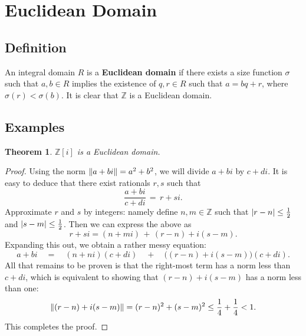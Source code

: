 \documentclass[11pt]{article}
\newtheorem{theorem}{Theorem}
\begin{document}
\section{Euclidean Domain}


\subsection{Definition}

An integral domain $R$ is a  \textbf{Euclidean domain} if there exists a size function $\sigma$ such that $a, b \in R$ implies the existence of $q, r \in R$ such that $a = bq + r$, where $\sigma(r) < \sigma(b)$. It is clear that $\mathbb{Z}$ is a Euclidean domain.


\subsection{Examples}

\begin{adjustwidth}{0.5cm}{}
  \begin{theorem}
    $\mathbb{Z}[i]$ is a Euclidean domain.
  \end{theorem}
  \begin{proof}
    Using the norm $\norm{a + bi} = a^{2} + b^{2}$, we will divide $a + bi$ by $c + di$. It is easy to deduce that there exist rationals $r, s$ such that
    \[
      \frac{a + bi}{c + di} \, = \, r + si.
    \]
    Approximate $r$ and $s$ by integers: namely define $n, m 
    \in \mathbb{Z}$ such that $\abs{r - n} \le \tfrac{1}{2}$ and $\abs{s - m} \le \tfrac{1}{2}$. Then we can express the above as
    \[
      r + si  = (n + mi ) \, + \, (r - n) + i(s - m).
    \]
    Expanding this out, we obtain a rather messy equation:
    \[
      a + bi \quad = \quad (n + ni )(c + di ) \quad + \quad \big( (r - n) + i(s - m)  \big)(c + di ).
    \]
    All that remains to be proven is that the right-most term has a norm less than $c + di$, which is equivalent to showing that $(r - n) + i (s - m) $ has a norm less than one:
    \[
      \norm{(r - n) + i(s - m) } = (r - n)^{2} + (s - m)^{2} \le \frac{1}{4} + \frac{1}{4} < 1.
    \]
    This completes the proof.
  \end{proof}
\end{adjustwidth}

\end{document}
